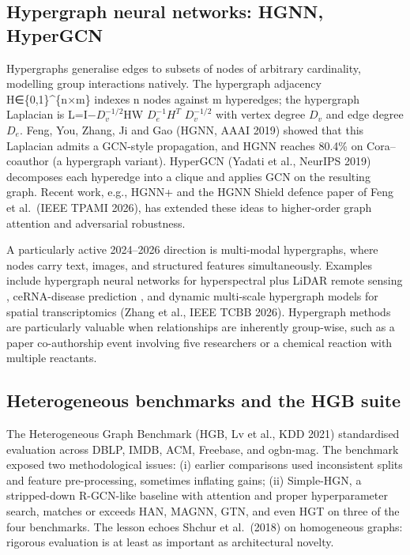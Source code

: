 \documentclass{article}
\begin{document}
\subsection{Hypergraph neural networks: HGNN, HyperGCN}\label{hypergraph-neural-networks-hgnn-hypergcn}

Hypergraphs generalise edges to subsets of nodes of arbitrary cardinality, modelling group interactions natively. The hypergraph adjacency H∈\{0,1\}\^{}\{n×m\} indexes n nodes against m hyperedges; the hypergraph Laplacian is L=I−\(D_v^{−1/2}\)HW \(D_e^{−1}\)\(H^T\) \(D_v^{−1/2}\) with vertex degree \(D_v\) and edge degree \(D_e\). Feng, You, Zhang, Ji and Gao (HGNN, AAAI 2019) showed that this Laplacian admits a GCN-style propagation, and HGNN reaches 80.4\% on Cora--coauthor (a hypergraph variant). HyperGCN (Yadati et al., NeurIPS 2019) decomposes each hyperedge into a clique and applies GCN on the resulting graph. Recent work, e.g., HGNN+ and the HGNN Shield defence paper of Feng et al.~(IEEE TPAMI 2026), has extended these ideas to higher-order graph attention and adversarial robustness.

A particularly active 2024--2026 direction is multi-modal hypergraphs, where nodes carry text, images, and structured features simultaneously. Examples include hypergraph neural networks for hyperspectral plus LiDAR remote sensing \citep{wang20252025}, ceRNA-disease prediction \citep{wang20252025}, and dynamic multi-scale hypergraph models for spatial transcriptomics (Zhang et al., IEEE TCBB 2026). Hypergraph methods are particularly valuable when relationships are inherently group-wise, such as a paper co-authorship event involving five researchers or a chemical reaction with multiple reactants.

\subsection{Heterogeneous benchmarks and the HGB suite}\label{heterogeneous-benchmarks-and-the-hgb-suite}

The Heterogeneous Graph Benchmark (HGB, Lv et al., KDD 2021) standardised evaluation across DBLP, IMDB, ACM, Freebase, and ogbn-mag. The benchmark exposed two methodological issues: (i) earlier comparisons used inconsistent splits and feature pre-processing, sometimes inflating gains; (ii) Simple-HGN, a stripped-down R-GCN-like baseline with attention and proper hyperparameter search, matches or exceeds HAN, MAGNN, GTN, and even HGT on three of the four benchmarks. The lesson echoes Shchur et al.~(2018) on homogeneous graphs: rigorous evaluation is at least as important as architectural novelty.
\end{document}
